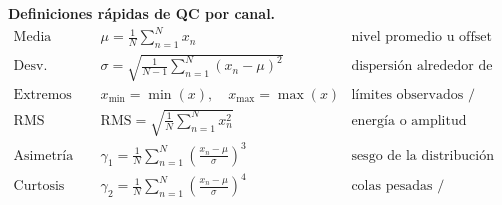 \begin{parametros}
\small
\textbf{Definiciones rápidas de QC por canal.}
\[
\begin{array}{lll}
\text{Media} & \displaystyle \mu=\frac{1}{N}\sum_{n=1}^{N}x_n
& \text{nivel promedio u offset DC} \\[7pt]
\text{Desv. estándar} & \displaystyle \sigma=\sqrt{\frac{1}{N-1}\sum_{n=1}^{N}(x_n-\mu)^2}
& \text{dispersión alrededor de la media} \\[7pt]
\text{Extremos} & \displaystyle x_{\min}=\min(x),\quad x_{\max}=\max(x)
& \text{límites observados / saturación} \\[7pt]
\text{RMS} & \displaystyle \mathrm{RMS}=\sqrt{\frac{1}{N}\sum_{n=1}^{N}x_n^2}
& \text{energía o amplitud cuadrática media} \\[7pt]
\text{Asimetría} & \displaystyle \gamma_1=\frac{1}{N}\sum_{n=1}^{N}\left(\frac{x_n-\mu}{\sigma}\right)^3
& \text{sesgo de la distribución} \\[7pt]
\text{Curtosis} & \displaystyle \gamma_2=\frac{1}{N}\sum_{n=1}^{N}\left(\frac{x_n-\mu}{\sigma}\right)^4
& \text{colas pesadas / impulsividad}
\end{array}
\]
\end{parametros}
